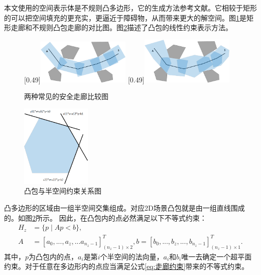 \documentclass[master,academic]{ysuthesis} %
\begin{document}
	本文使用的空间表示体是不规则凸多边形，它的生成方法参考文献\cite{SikangLiu:2017}。它相较于矩形的可以把空间填充的更充实，更逼近于障碍物，从而带来更大的解空间。图\ref{安全走廊比较}是矩形走廊和不规则凸包走廊的对比图。图\ref{fig:凸包矩阵}描述了凸包的线性约束表示方法。
	\begin{figure}[!ht]
		\centering
		[0.49\textwidth]{\includegraphics[width=0.4\textwidth]{安全走廊比较矩形1.png}}
		[0.49\textwidth]{\includegraphics[width=0.4\textwidth]{安全走廊比较多边形2.png}}
		\caption{两种常见的安全走廊比较图}
		\label{安全走廊比较}
	\end{figure}
	\begin{figure}[!ht]
		\centering
		\includegraphics[width=0.3\textwidth]{凸包矩阵.png}
		\caption{凸包与半空间约束关系图}
		\label{fig:凸包矩阵}
	\end{figure}
	
	凸多边形的区域由一组半空间交集组成。对应2D场景凸包就是由一组直线围成的。如图\ref{fig:凸包矩阵}所示。
	因此，在凸包内的点必然满足以下不等式约束：
	\begin{equation}
		\begin{aligned}
			H_z&=\{p\mid Ap<b\},\\
			A&=\left[ a_0,...,a_z,...a_{n_z-1} \right]^T_{(n_z-1)\times 2},b=\left[ b_0,...,b_z,...,b_{n_z-1} \right]^T_{(n_z-1)\times 1}.
		\end{aligned}
		\label{eq:走廊约束}
	\end{equation}
	其中，$p$为凸包内的点，$a_i$是第$i$个半空间的法向量，$a_i$和$b_i$唯一去确定一个超平面约束。对于任意在多边形内的点应当满足公式\ref{eq:走廊约束}带来的不等式约束。
	
\end{document}
